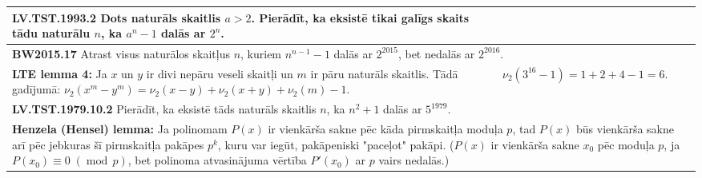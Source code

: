 \documentclass[a4paper]{article}
\begin{document}
\begin{table}[ht!]
{\begin{tabular*}{18.46cm}{@{}|p{10.35cm}|p{7.25cm}|@{}}
{{\bf LV.TST.1993.2} Dots naturāls skaitlis $a > 2$. Pierādīt, ka eksistē tikai galīgs skaits tādu naturālu 
$n$, ka $a^n-1$ dalās ar $2^n$.
} \\ \hline
\multicolumn{2}{|p{18.05cm}|}{
\cellcolor[HTML]{E1FFE1}
{\bf BW2015.17} Atrast visus naturālos skaitļus $n$, kuriem $n^{n−1}−1$ dalās ar
$2^{2015}$, bet nedalās ar $2^{2016}$.
} \\ \hline
{\bf LTE lemma 4:}  Ja $x$ un $y$ ir divi nepāru veseli skaitļi
un $m$ ir pāru naturāls skaitlis. Tādā gadījumā:
$\nu_2(x^m - y^m) = \nu_2(x-y) + \nu_2(x+y) + \nu_2(m) - 1$. &
$\nu_2(3^{16} - 1) = 1+2+4-1=6$. \\ \hline
\multicolumn{2}{|p{18.05cm}|}{
\cellcolor[HTML]{E1FFE1}
{\bf LV.TST.1979.10.2} Pierādīt, ka eksistē tāds naturāls skaitlis $n$, ka $n^2+1$ dalās ar $5^{1979}$.
} \\ \hline
\multicolumn{2}{|p{18.05cm}|}{
{\bf Henzela (Hensel) lemma:} Ja polinomam $P(x)$ ir vienkārša sakne pēc kāda pirmskaitļa moduļa $p$, 
tad $P(x)$ būs vienkārša sakne arī pēc jebkuras šī pirmskaitļa pakāpes $p^k$, kuru var iegūt, pakāpeniski 
"paceļot" pakāpi. ($P(x)$ ir vienkārša sakne $x_0$ pēc moduļa $p$, 
ja $P(x_0) \equiv 0\;(\operatorname{mod}\,p)$, bet polinoma atvasinājuma vērtība $P'(x_0)$ ar $p$ vairs nedalās.)
} \\ \hline
\end{tabular*}
}
\end{table}
\end{document}
